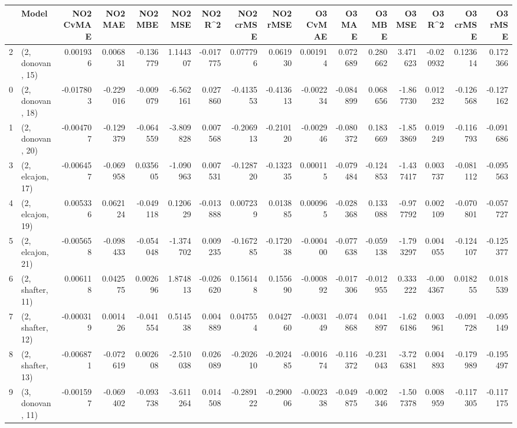\begin{tabular}{llrrrrrrrrrrrrrr}
\toprule
{} &             Model &  NO2 CvMAE &   NO2 MAE &   NO2 MBE &    NO2 MSE &   NO2 R\textasciicircum2 &  NO2 crMSE &  NO2 rMSE &  O3 CvMAE &    O3 MAE &    O3 MBE &     O3 MSE &    O3 R\textasciicircum2 &  O3 crMSE &   O3 rMSE \\
\midrule
2  &  (2, donovan, 15) &   0.001936 &  0.006831 & -0.136779 &   1.144307 & -0.017775 &   0.077796 &  0.061930 &  0.001914 &  0.072689 &  0.280662 &   3.471623 & -0.020932 &  0.123614 &  0.172366 \\
0  &  (2, donovan, 18) &  -0.017803 & -0.229016 & -0.009079 &  -6.562161 &  0.027860 &  -0.413553 & -0.413613 & -0.002234 & -0.084899 &  0.068656 &  -1.867730 &  0.012232 & -0.126568 & -0.127162 \\
1  &  (2, donovan, 20) &  -0.004707 & -0.129379 & -0.064559 &  -3.809828 &  0.007568 &  -0.206913 & -0.210120 & -0.002946 & -0.080372 &  0.183669 &  -1.853869 &  0.019249 & -0.116793 & -0.091686 \\
3  &  (2, elcajon, 17) &  -0.006457 & -0.069958 &  0.035605 &  -1.090963 &  0.007531 &  -0.128720 & -0.132335 &  0.000115 & -0.079484 & -0.124853 &  -1.437417 &  0.003737 & -0.081112 & -0.095563 \\
4  &  (2, elcajon, 19) &   0.005336 &  0.062124 & -0.049118 &   0.120629 & -0.013888 &   0.007239 &  0.013885 &  0.000965 & -0.028368 &  0.133088 &  -0.977792 &  0.002109 & -0.070801 & -0.057727 \\
5  &  (2, elcajon, 21) &  -0.005658 & -0.098433 & -0.054048 &  -1.374702 &  0.009235 &  -0.167285 & -0.172038 & -0.000400 & -0.077638 & -0.059138 &  -1.793297 &  0.004055 & -0.124107 & -0.125377 \\
6  &  (2, shafter, 11) &   0.006118 &  0.042575 &  0.002696 &   1.874813 & -0.026620 &   0.156148 &  0.155690 & -0.000892 & -0.017306 & -0.012955 &   0.333222 & -0.004367 &  0.018255 &  0.018539 \\
7  &  (2, shafter, 12) &  -0.000319 &  0.001426 & -0.041554 &   0.514538 &  0.004889 &   0.047554 &  0.042760 & -0.003149 & -0.074868 &  0.041897 &  -1.626186 &  0.003961 & -0.091728 & -0.095149 \\
8  &  (2, shafter, 13) &  -0.006871 & -0.072619 &  0.002608 &  -2.510038 &  0.026089 &  -0.202610 & -0.202485 & -0.001674 & -0.116372 & -0.231043 &  -3.726381 &  0.004893 & -0.179989 & -0.195497 \\
9  &  (3, donovan, 11) &  -0.001597 & -0.069402 & -0.093738 &  -3.611264 &  0.014508 &  -0.289122 & -0.290006 & -0.002338 & -0.049875 & -0.002346 &  -1.507378 &  0.008959 & -0.117305 & -0.117175 \\

\end{tabular}
